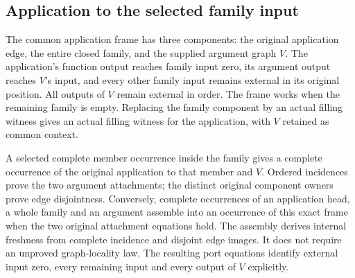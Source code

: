 \par{}
%

\subsection{Application to the selected family input}
The common application frame has three components: the original application
edge, the entire closed family, and the supplied argument graph $V$.
The application's function output reaches family input zero, its argument
output reaches $V$'s input, and every other family input remains external
in its original position. All outputs of $V$ remain external in order.
The frame works when the remaining family is empty. Replacing the family
component by an actual filling witness gives an actual filling witness for
the application, with $V$ retained as common context.

A selected complete member occurrence inside the family gives a complete
occurrence of the original application to that member and $V$. Ordered
incidences prove the two argument attachments; the distinct original
component owners prove edge disjointness. Conversely, complete occurrences
of an application head, a whole family and an argument assemble into an
occurrence of this exact frame when the two original attachment equations
hold. The assembly derives internal freshness from complete incidence and
disjoint edge images. It does not require an unproved graph-locality law.
The resulting port equations identify external input zero, every remaining
input and every output of $V$ explicitly.

\par{}
\par{}
\par{}
\par{}
\par{}
%

